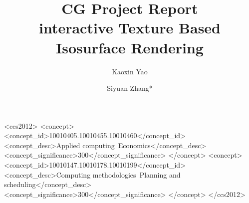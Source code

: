 \documentclass[sigconf]{acmart}
\begin{document}
\title{CG Project Report \\ interactive Texture Based Isosurface Rendering}

\author{Kaoxin Yao}

\author{Siyuan Zhang*}






\begin{CCSXML}
<ccs2012>
   <concept>
       <concept_id>10010405.10010455.10010460</concept_id>
       <concept_desc>Applied computing~Economics</concept_desc>
       <concept_significance>300</concept_significance>
       </concept>
   <concept>
       <concept_id>10010147.10010178.10010199</concept_id>
       <concept_desc>Computing methodologies~Planning and scheduling</concept_desc>
       <concept_significance>300</concept_significance>
       </concept>
 </ccs2012>
\end{CCSXML}



\keywords{}

\end{document}

